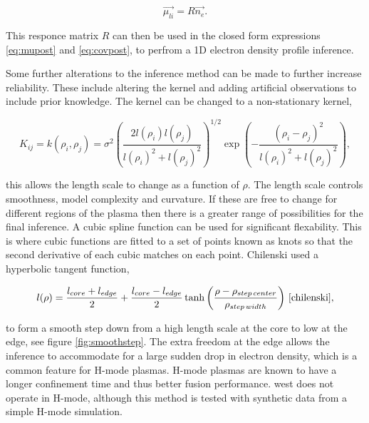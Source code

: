 \begin{equation}
  \vec{\mu_{li}} = R \vec{n_e}.
\end{equation}

\noindent This responce matrix $R$ can then be used in the closed form expressions \ref{eq:mupost} and \ref{eq:covpost}, to perfrom a 1D electron density profile inference.

Some further alterations to the inference method can be made to further increase reliability. These include altering the kernel and adding artificial observations to include prior knowledge. The kernel can be changed to a non-stationary kernel, 

\begin{equation}
  K_{ij} = k(\rho_i, \rho_j) = \sigma^2 \left( \frac{2l(\rho_i)l(\rho_j)}{l(\rho_i)^2 + l(\rho_j)^2} \right)^{1/2} \exp\left(-{\frac{(\rho_i - \rho_j)^2}{l(\rho_i)^2+l(\rho_j)^2}}\right),
\end{equation}

\noindent this allows the length scale to change as a function of $\rho$. The length scale controls smoothness, model complexity and curvature. If these are free to change for different regions of the plasma then there is a greater range of possibilities for the final inference. A cubic spline function can be used for significant flexability. This is where cubic functions are fitted to a set of points known as knots so that the second derivative of each cubic matches on each point. Chilenski used a hyperbolic tangent function,

\begin{equation}
  l(\rho) = \frac{l_{core} + l_{edge}}{2} + \frac{l_{core} - l_{edge}}{2} \tanh\left(\frac{\rho-\rho_{step\,center}}{\rho_{step\,width}}\right) \, \cite{chilenski}, 
  \label{eq:smoothstep}
\end{equation}

\noindent to form a smooth step down from a high length scale at the core to low at the edge, see figure \ref{fig:smoothstep}. The extra freedom at the edge allows the inference to accommodate for a large sudden drop in electron density, which is a common feature for H-mode plasmas. H-mode plasmas are known to have a longer confinement time and thus better fusion performance. \gls{west} does not operate in H-mode, although this method is tested with synthetic data from a simple H-mode simulation.

